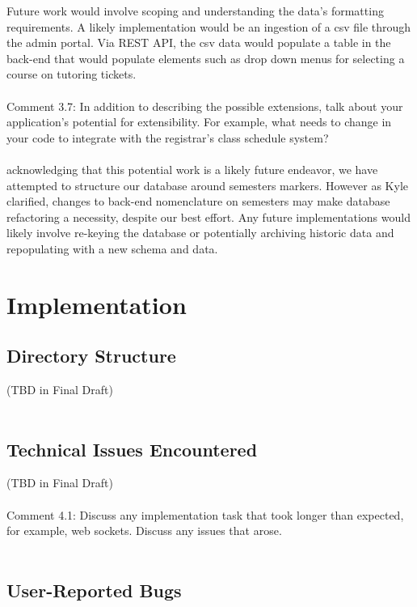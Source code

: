 \documentclass[oneside,openany,obeyspaces]{book}
\newcommand\tab[1][1cm]{\hspace*{#1}}
\begin{document}
\begin{flushleft}
    \tab Future work would involve scoping and understanding the data's formatting requirements. A likely implementation would be an ingestion of a csv file through the admin portal. Via REST API, the csv data would populate a table in the back-end that would populate elements such as drop down menus for selecting a course on tutoring tickets.\\~\\
    {\color{red}Comment 3.7: In addition to describing the possible extensions, talk about your application's potential for extensibility. For example, what needs to change in your code to integrate with the registrar's class schedule system?\\~\\}
    {\color{blue}\tab acknowledging that this potential work is a likely future endeavor, we have attempted to structure our database around semesters markers. However as Kyle clarified, changes to back-end nomenclature on semesters may make database refactoring a necessity, despite our best effort. Any future implementations would likely involve re-keying the database or potentially archiving historic data and repopulating with a new schema and data.}


    \chapter{Implementation}

    \section{Directory Structure}

    \tab (TBD in Final Draft)\\~\\


    \section{Technical Issues Encountered}

    \tab (TBD in Final Draft)\\~\\
    {\color{red}Comment 4.1: Discuss any implementation task that took longer than expected, for example, web sockets. Discuss any issues that arose.  \\~\\}


    \section{User-Reported Bugs}


\end{flushleft}
\end{document}
